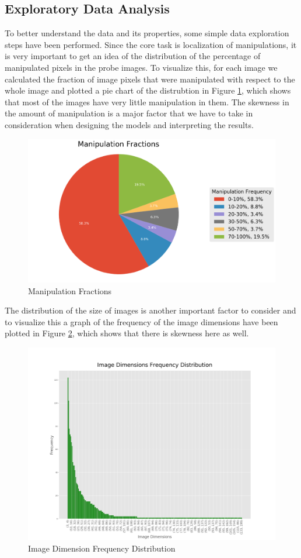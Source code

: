 \subsection{Exploratory Data Analysis}

To better understand the data and its properties, some simple data exploration steps have been performed. Since the core 
task is localization of manipulations, it is very important to get an idea of the distribution of the percentage of 
manipulated pixels in the probe images. To visualize this, for each image we calculated the fraction of image pixels that 
were manipulated with respect to the whole image and plotted a pie chart of the distrubtion in Figure 
\ref{fig:manipulation_fractions}, which shows that most of the images have very little
manipulation in them. The skewness in the amount of manipulation is a major factor that we have to take in consideration 
when designing the models and interpreting the results.

\begin{figure}
    \centering
    \includegraphics[width=\textwidth]
        {figures/manipulation_fractions_0_-1.png}
    \caption{Manipulation Fractions}
    \label{fig:manipulation_fractions}
\end{figure}

The distribution of the size of images is another important factor to consider and to visualize this a graph of the 
frequency of the image dimensions have been plotted in Figure \ref{fig:dimension_distribution_graph}, which shows 
that there is skewness here as well.

\begin{figure}
    \centering
    \includegraphics[width=\textwidth]
        {figures/image_distribution_0_-1.png}
    \caption{Image Dimension Frequency Distribution}
    \label{fig:dimension_distribution_graph}
\end{figure}
